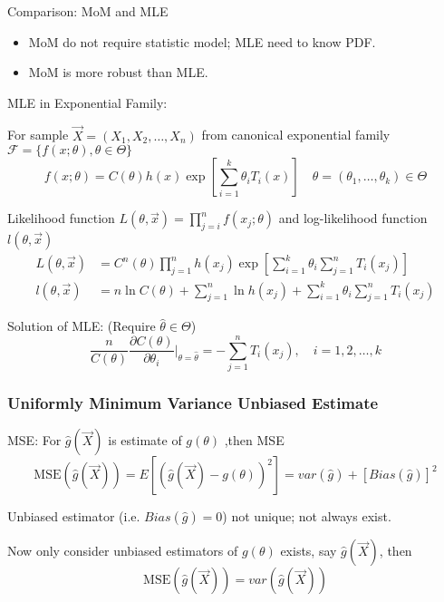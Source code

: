     \begin{point}
        Comparison: MoM and MLE
    \end{point}
    
        
    \begin{itemize}
        \item MoM do not require statistic model; MLE need to know PDF.
        \item MoM is more robust than MLE.
    \end{itemize}


    MLE in Exponential Family:

        For sample $\vec{X}=(X_1,X_2,\ldots,X_n)$ from canonical exponential family $\mathscr{F}=\{f(x;\theta),\theta\in\Theta\}$
        \[
            f(x;\theta)=C(\theta)h(x)\exp\left[\sum_{i=1}^k\theta_iT_i(x)\right]\quad \theta=(\theta_1,\ldots,\theta_k)\in\Theta
        \]

        Likelihood function $L(\theta,\vec{x})=\prod_{j=i}^nf(x_j;\theta)$ and log-likelihood function $l(\theta,\vec{x})$
        \begin{align*}
            L(\theta,\vec{x})&=C^n(\theta)\prod_{j=1}^nh(x_j)\exp\left[\sum_{i=1}^k\theta_i\sum_{j=1}^n T_i(x_j)\right]\\
            l(\theta,\vec{x})&=n\ln C(\theta)+\sum_{j=1}^n\ln h(x_j)+\sum_{i=1}^k\theta_i\sum_{j=1}^nT_i(x_j)
        \end{align*}

        Solution of MLE: (Require $\hat{\theta}\in\Theta$)
        \[
            \frac{n}{C(\theta)}\frac{\partial C(\theta)}{\partial \theta_i}\bigg|_{\theta=\hat{\theta}}=-\sum_{j=1}^nT_i(x_j),\quad i=1,2,\ldots,k    
        \]


\subsubsection{Uniformly Minimum Variance Unbiased Estimate}\label{SubSectionUMVUE}
        MSE: For $\hat{g}(\vec{X})$ is estimate of $g(\theta)$ ,then MSE
        \[
            \mathrm{MSE}(\hat{g}(\vec{X}))=E[(\hat{g}(\vec{X})-g(\theta))^2]=var(\hat{g})+[Bias(\hat{g})]^2
        \]
\begin{point}
    Unbiased estimator (i.e. $Bias(\hat{g})=0$) not unique; not always exist.
\end{point}

    


        Now only consider unbiased estimators of $g(\theta)$ exists, say $\hat{g}(\vec{X})$, then
        \[ \mathrm{MSE}(\hat{g}(\vec{X}))=var(\hat{g}(\vec{X})) \]

